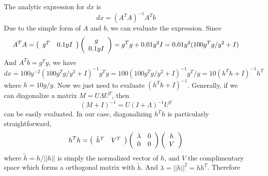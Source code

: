 \documentclass[]{article}
\begin{document}
The analytic expression for $dx$ is
\begin{equation}
  dx=(A^TA)^{-1}A^Tb
\end{equation}
Due to the simple form of $A$ and $b$, we can evaluate the expression. Since
\begin{equation}
  A^TA=\left( 
  \begin{array}[c]{cc}
    g^T&0.1yI
  \end{array}
  \right)\left( 
  \begin{array}[c]{c}
    g\\
    0.1yI
  \end{array}
  \right)=g^Tg+0.01y^2I=0.01y^2(100g^Tg/y^2+I)
\end{equation}
And $A^Tb=g^Ty$, we have
\begin{equation}
  dx=100y^{-2}(100g^Tg/y^2+I)^{-1}g^Ty=100(100g^Tg/y^2+I)^{-1}g^T/y=10(h^Th+I)^{-1}h^T
\end{equation}
where $h=10g/y$. Now we just need to evaluate $(h^Th+I)^{-1}$. Generally, if we can diagonalize a matrix $M=U\Lambda U^T$, then
\begin{equation}
  (M+I)^{-1}=U(I+\Lambda)^{-1}U^T
\end{equation}
can be easily evaluated. In our case, diagonalizing $h^Th$ is particularly straightforward,
\begin{equation}
  h^Th=\left( 
  \begin{array}[c]{cc}
    \tilde{h}^T&V^T
  \end{array}
  \right)\left( 
  \begin{array}[c]{cc}
    \lambda&0\\
    0&0
  \end{array}
  \right)\left( 
  \begin{array}[c]{c}
    h\\
    V
  \end{array}
  \right)
\end{equation}
where $\tilde{h}=h/||h||$ is simply the normalized vector of $h$, and $V$ the complimentary space which forms a orthogonal matrix with $\tilde{h}$. And $\lambda=||h||^2=hh^T$.
Therefore
\end{document}
